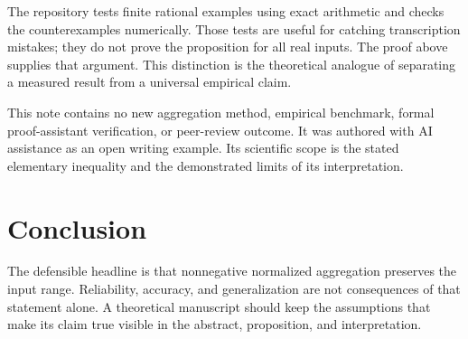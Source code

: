 \documentclass[
  10pt,
  letterpaper,
]{article}
\begin{document}
The repository tests finite rational examples using exact arithmetic and
checks the counterexamples numerically. Those tests are useful for
catching transcription mistakes; they do not prove the proposition for
all real inputs. The proof above supplies that argument. This
distinction is the theoretical analogue of separating a measured result
from a universal empirical claim.

This note contains no new aggregation method, empirical benchmark,
formal proof-assistant verification, or peer-review outcome. It was
authored with AI assistance as an open writing example. Its scientific
scope is the stated elementary inequality and the demonstrated limits of
its interpretation.

\section{Conclusion}\label{conclusion}

The defensible headline is that nonnegative normalized aggregation
preserves the input range. Reliability, accuracy, and generalization are
not consequences of that statement alone. A theoretical manuscript
should keep the assumptions that make its claim true visible in the
abstract, proposition, and interpretation.


\end{document}
